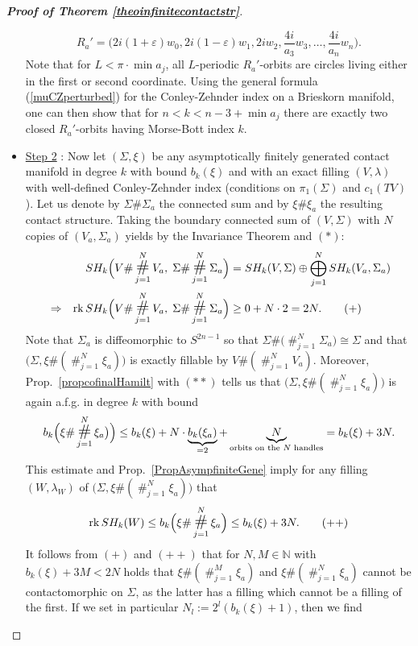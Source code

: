 \documentclass[a4paper,12pt,bibliography=totocnumbered,titlepage=false,abstracton,bookmarksnumbered=true]{scrartcl}
\DeclareMathOperator*{\consumt}{\#}
\DeclareMathOperator*{\consumd}{\text{\Large$\#$}}
\DeclareMathOperator{\rk}{rk}
\newcommand{\veps}{\varepsilon}
\theoremstyle{definition}
\begin{document}
\begin{proof}[\textnormal{\textbf{Proof of Theorem \ref{theoinfinitecontactstr}}}]
\begin{itemize}
  \[R_a'=\Big(2i(1{+}\veps)w_0, 2i(1{-}\veps)w_1, 2iw_2, \frac{4i}{a_3}w_3,\dots,\frac{4i}{a_n}w_n\Big).\]
  Note that for $L<\pi{\cdot}\min a_j$, all $L$-periodic $R_a'$-orbits are circles living either in the first or second coordinate. Using the general formula (\ref{muCZperturbed}) for the Conley-Zehnder index on a Brieskorn manifold, one can then show that for $n<k<n{-}3 + \min a_j$ there are exactly two closed $R_a'$-orbits having Morse-Bott index $k$.
  \item \underline{Step 2} : Now let $(\Sigma,\xi)$ be any asymptotically finitely generated contact manifold in degree $k$ with bound $b_k(\xi)$ and with an exact filling $(V,\lambda)$ with well-defined Conley-Zehnder index (conditions on $\pi_1(\Sigma)$ and $c_1(TV)$). Let us denote by $\Sigma\# \Sigma_a$ the connected sum and by $\xi\#\xi_a$ the resulting contact structure. Taking the boundary connected sum of $(V,\Sigma)$ with $N$ copies of $(V_a,\Sigma_a)$ yields by the Invariance Theorem and $(\ast)$:
  \begin{align*}
   && SH_k\Big(V \#\consumd_{j=1}^{N} V_a,\; \Sigma \#\consumd_{j=1}^{N} \Sigma_a\Big)&= SH_k(V,\Sigma)\oplus \bigoplus_{j=1}^{N} SH_k(V_a,\Sigma_a)\\
   &\Rightarrow& \rk SH_k\Big(V \#\consumd_{j=1}^{N} V_a,\; \Sigma \#\consumd_{j=1}^{N} \Sigma_a\Big)&\geq 0+N\cdot 2=2N.\tag{$+$}
  \end{align*}
  Note that $\Sigma_a$ is diffeomorphic to $S^{2n-1}$ so that $\Sigma\#\big(\consumt_{j=1}^{N}\Sigma_a\big)\cong\Sigma$ and that $\big(\Sigma,\xi \#(\consumt_{j=1}^{N} \xi_a)\big)$ is exactly fillable by $V \#(\consumt_{j=1}^{N} V_a)$. Moreover, Prop.\ \ref{propcofinalHamilt} with $(\ast\ast)$ tells us that $\big(\Sigma, \xi \#(\consumt_{j=1}^{N} \xi_a)\big)$ is again a.f.g. in degree $k$ with bound
  \[b_k\Big(\xi \#\consumd_{j=1}^{N} \xi_a\big)\Big)\leq b_k(\xi)+N\cdot\underbrace{b_k(\xi_a)}_{=2}+\underbrace{N}_{\text{orbits on the $N$ handles}}=b_k(\xi)+3N.\]
  This estimate and Prop.\ \ref{PropAsympfiniteGene} imply for any filling $(W,\lambda_W)$ of $\big(\Sigma,\xi\#(\consumt_{j=1}^{N} \xi_a)\big)$ that
  \[\rk SH_k(W)\leq b_k\Big(\xi\#\consumd_{j=1}^{N} \xi_a\Big)\leq b_k(\xi)+3N.\tag{$++$}\]
   It follows from $(+)$ and $(++)$ that for $N,M\in\mathbb{N}$ with $b_k(\xi)+3M<2N$ holds that $\xi \#(\consumt_{j=1}^{M} \xi_a)$ and $\xi \#(\consumt_{j=1}^{N} \xi_a)$ cannot be contactomorphic on $\Sigma$, as the latter has a filling which cannot be a filling of the first. If we set in particular $N_l:=2^l(b_k(\xi)+1)$, then we find

\end{itemize}
\end{proof}
\end{document}
